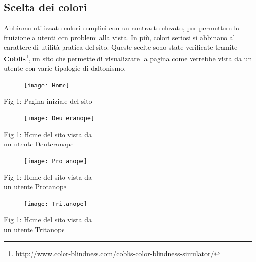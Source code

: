 \documentclass{tecweb}
\begin{document}
	\subsection{Scelta dei colori}
	Abbiamo utilizzato colori semplici con un contrasto elevato, 
	per permettere la fruizione a utenti con problemi alla vista. In più, colori seriosi si abbinano al carattere di utilità pratica del sito.
	Queste scelte sono state verificate tramite \textbf{Coblis}\footnote{\url{http://www.color-blindness.com/coblis-color-blindness-simulator/}}, un sito che permette di visualizzare la pagina come verrebbe vista da un utente con varie tipologie di daltonismo.\\
	\begin{minipage}{0.5\textwidth}
		\begin{figure}[H]
			\flushleft\texttt{[image: Home]}
		\end{figure}
	\end{minipage}\hfill
	\begin{minipage}{0.5\textwidth}
		Fig 1: Pagina iniziale del sito	\\
	\end{minipage}
	\begin{minipage}{0.5\textwidth}
		\begin{figure}[H]
			\flushleft\texttt{[image: Deuteranope]}
		\end{figure}
	\end{minipage} \hfill
	\begin{minipage}{1\textwidth}
		Fig 1: Home del sito vista da\\ un utente Deuteranope	\\
	\end{minipage}
	\begin{minipage}{0.5\textwidth}
		\begin{figure}[H]
			\flushleft\texttt{[image: Protanope]}
		\end{figure}
	\end{minipage} \hfill
	\begin{minipage}{1\textwidth}
		Fig 1: Home del sito vista da\\ un utente Protanope	\\
	\end{minipage}
	\begin{minipage}{0.5\textwidth}
		\begin{figure}[H]
			\flushleft\texttt{[image: Tritanope]}
		\end{figure}
	\end{minipage} \hfill
	\begin{minipage}{1\textwidth}
		Fig 1: Home del sito vista da\\ un utente Tritanope	\\
	\end{minipage}
	\vspace{0.5cm}
	
\end{document}
